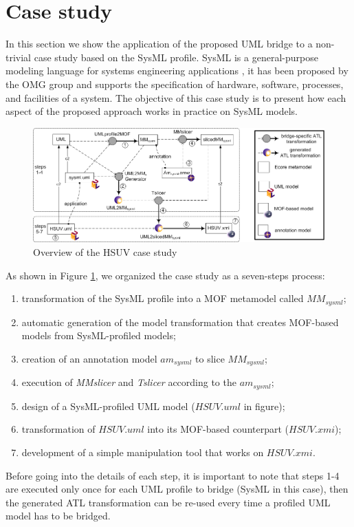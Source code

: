 \section{Case study}\label{sec:caseStudy}
In this section we show the application of the proposed UML bridge to a non-trivial case study based on the SysML profile.
SysML is a general-purpose modeling language for systems engineering applications \cite{sysml}, it has been proposed by the OMG group
and supports the specification of  hardware, software, processes, and facilities of a system.
The objective of this case study is to present how each aspect of the proposed approach works in practice on SysML models.

\begin{figure}[htbp]
	\centering
		\includegraphics[width=1\textwidth]{figures/caseStudy.png}
	\caption{Overview of the HSUV case study}
	\label{fig:caseStudy}
\end{figure}

As shown in Figure \ref{fig:caseStudy}, we organized the case study as a seven-steps process:
%
\begin{enumerate}
	\item transformation of the SysML profile into a MOF metamodel called $MM_{sysml}$;
	\item automatic generation of the model transformation that creates MOF-based models from SysML-profiled models;
	\item creation of an annotation model $am_{sysml}$ to slice $MM_{sysml}$;
	\item execution of \textit{MMslicer} and \textit{Tslicer} according to the $am_{sysml}$;
	\item design of a SysML-profiled UML model ($HSUV.uml$ in figure);
	\item transformation of $HSUV.uml$ into its MOF-based counterpart ($HSUV.xmi$);
	\item development of a simple manipulation tool that works on $HSUV.xmi$.
\end{enumerate}
%
Before going into the details of each step, it is important to note that steps 1-4 are executed only once for each
UML profile to bridge (SysML in this case), then the generated ATL transformation 
can be re-used every time a profiled UML model has to be bridged.

